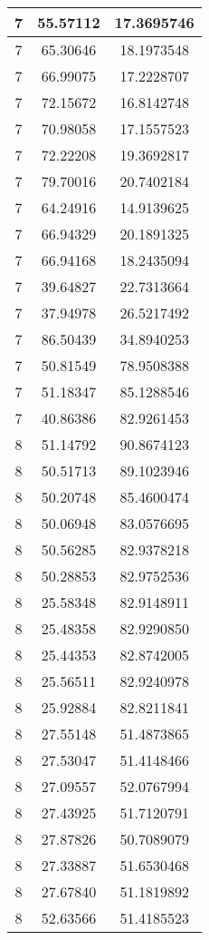 \documentclass[
]{book}
\begin{document}
\begin{tabular}{c|c|c}
\hline
7 & 55.57112 & 17.3695746\\
\hline
7 & 65.30646 & 18.1973548\\
\hline
7 & 66.99075 & 17.2228707\\
\hline
7 & 72.15672 & 16.8142748\\
\hline
7 & 70.98058 & 17.1557523\\
\hline
7 & 72.22208 & 19.3692817\\
\hline
7 & 79.70016 & 20.7402184\\
\hline
7 & 64.24916 & 14.9139625\\
\hline
7 & 66.94329 & 20.1891325\\
\hline
7 & 66.94168 & 18.2435094\\
\hline
7 & 39.64827 & 22.7313664\\
\hline
7 & 37.94978 & 26.5217492\\
\hline
7 & 86.50439 & 34.8940253\\
\hline
7 & 50.81549 & 78.9508388\\
\hline
7 & 51.18347 & 85.1288546\\
\hline
7 & 40.86386 & 82.9261453\\
\hline
8 & 51.14792 & 90.8674123\\
\hline
8 & 50.51713 & 89.1023946\\
\hline
8 & 50.20748 & 85.4600474\\
\hline
8 & 50.06948 & 83.0576695\\
\hline
8 & 50.56285 & 82.9378218\\
\hline
8 & 50.28853 & 82.9752536\\
\hline
8 & 25.58348 & 82.9148911\\
\hline
8 & 25.48358 & 82.9290850\\
\hline
8 & 25.44353 & 82.8742005\\
\hline
8 & 25.56511 & 82.9240978\\
\hline
8 & 25.92884 & 82.8211841\\
\hline
8 & 27.55148 & 51.4873865\\
\hline
8 & 27.53047 & 51.4148466\\
\hline
8 & 27.09557 & 52.0767994\\
\hline
8 & 27.43925 & 51.7120791\\
\hline
8 & 27.87826 & 50.7089079\\
\hline
8 & 27.33887 & 51.6530468\\
\hline
8 & 27.67840 & 51.1819892\\
\hline
8 & 52.63566 & 51.4185523\\

\end{tabular}
\end{document}
